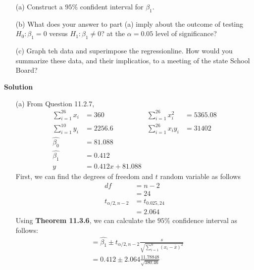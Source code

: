 \documentclass{uofa-eng-assignment}
\begin{document}
\begin{enumerate}
\begin{itemize}
            \item [(a)] Construct a $95\%$ confident interval for $\beta_1$.
            \item [(b)] What does your answer to part (a) imply about the outcome of
                  testing $H_0: \beta_1 = 0$ versus $H_1: \beta_1 \neq 0$? at the $\alpha=0.05$ level of significance?
            \item [(c)] Graph teh data and superimpose the regressionline. How would you summarize these data,
                  and their implicatios, to a meeting of the state School Board?
        \end{itemize}
        \textbf{Solution} \\
        \begin{itemize}
            \item [(a)] From Question 11.2.7,
                  \begin{align*}
                      \sum_{i=1}^{26}x_i & = 360 \qquad      & \sum_{i=1}^{26}x_i^2  & = 5365.08 \\
                      \sum_{i=1}^{10}y_i & = 2256.6 \qquad   & \sum_{i=1}^{26}x_iy_i & = 31402   \\
                      \hat{\beta_0}      & = 81.088                                              \\
                      \hat{\beta_1}      & = 0.412                                               \\
                      y                  & = 0.412x + 81.088
                  \end{align*}
                  First, we can find the degrees of freedom and $t$ random variable as follows
                  \begin{align*}
                      df                & = n - 2         \\
                                        & = 24            \\
                      t_{\alpha/2, n-2} & = t_{0.025, 24} \\
                                        & = 2.064
                  \end{align*}
                  Using \textbf{Theorem 11.3.6}, we can calculate the $95\%$ confidence interval as follows:
                  \begin{align*}
                       & = \hat{\beta_1} \pm t_{\alpha/2, n-2}\frac{s}{\sqrt{\sum_{i=1}^{n}(x_i - \bar{x})^2}} \\
                       & = 0.412 \pm 2.064\frac{11.78848}{\sqrt{380.46}}                                       \\

\end{align*}
\end{itemize}
\end{enumerate}
\end{document}
